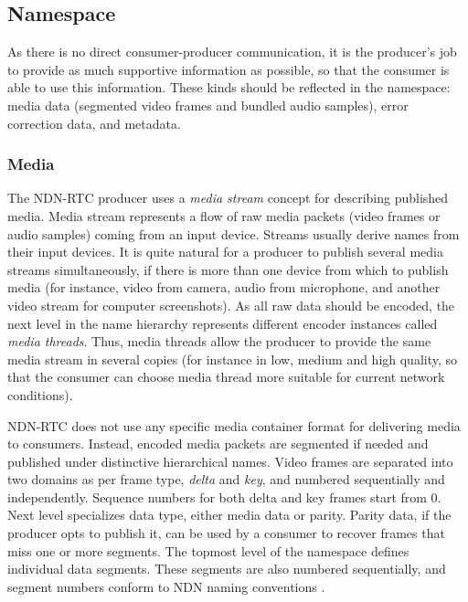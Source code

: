 \documentclass{icn/sig-alternate-2012} %
\newcommand{\ndnrtcName}{NDN-RTC} %
\begin{document}
\subsection{Namespace}

As there is no direct consumer-producer communication, it is the producer's job to provide as much supportive information as possible, so that the consumer is able to use this information. These kinds should be reflected in the namespace:
media data (segmented video frames and bundled audio samples), error correction data, and metadata. 


\subsubsection{Media} 

The \ndnrtcName{} producer uses a \textit{media stream} concept for describing published media. Media stream represents a flow of raw media packets (video frames or audio samples) coming from an input device. Streams usually derive names from their input devices. It is quite natural for a producer to publish several media streams simultaneously, if there is more than one device from which to publish media (for instance, video from camera, audio from microphone, and another video stream for computer screenshots). As all raw data should be encoded, the next level in the name hierarchy represents different encoder instances called \textit{media threads}. Thus, media threads allow the producer to provide the same media stream in several copies (for instance in low, medium and high quality, so that the consumer can choose media thread more suitable for current network conditions).


\ndnrtcName{} does not use any specific media container format for delivering media to consumers. Instead, encoded media packets are segmented if needed and published under distinctive hierarchical names. Video frames are separated into two domains as per frame type, \textit{delta} and \textit{key}, and numbered sequentially and independently. Sequence numbers for both delta and key frames start from 0. Next level specializes data type, either media data or parity. Parity data, if the producer opts to publish it, can be used by a consumer to recover frames that miss one or more segments. The topmost level of the namespace defines individual data segments. These segments are also numbered sequentially, and segment numbers conform to NDN naming conventions \cite{ndn_naming}.
\end{document}
